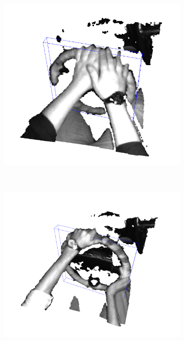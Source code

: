 \begin{figure}[ht]
\begin{subfigure}[t]{0.3\textwidth}
    \end{subfigure}\hfill
    \begin{subfigure}[t]{0.3\textwidth}
        \centering
        \includegraphics[width=\textwidth]{media/chapter 3/obb3.png}
    \end{subfigure}\\
    \begin{subfigure}[t]{0.3\textwidth}
        \centering
        \includegraphics[width=\textwidth]{media/chapter 3/obb4.png}

\end{subfigure}
\end{figure}
